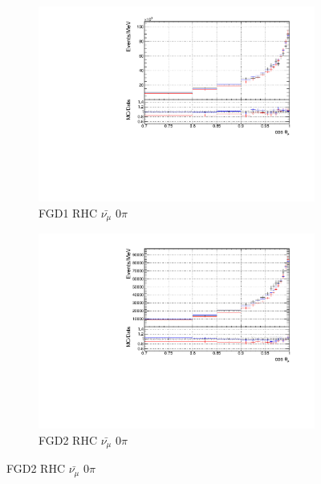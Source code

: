\begin{figure}[!htbp]
\begin{subfigure}{0.49\textwidth}
  \centering
  \includegraphics[width=\textwidth]{figs/priorpred1D_t_FGD1_anti-numuCC_0pi}
  \caption{FGD1 RHC $\bar{\nu_{\mu}}$ 0$\pi$}
\end{subfigure}
\begin{subfigure}{0.49\textwidth}
  \centering
  \includegraphics[width=\textwidth]{figs/priorpred1D_t_FGD2_anti-numuCC_0pi}
  \caption{FGD2 RHC $\bar{\nu_{\mu}}$ 0$\pi$}
\end{subfigure}


\end{figure}
